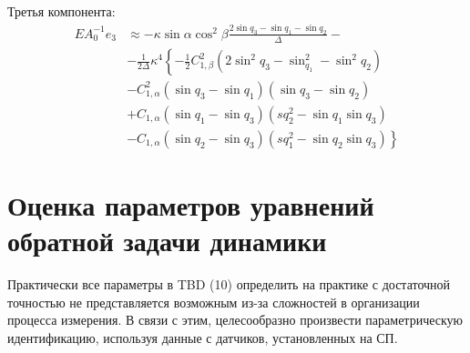 Третья компонента:
\begin{equation}
\begin{aligned}
EA^{-1}_0 e_3 & \approx -\kappa\sin{\alpha}\cos^2{\beta}\frac{2\sin{q_3} - \sin{q_1} - \sin{q_2}}{\Delta} - \\
& -\frac{1}{2\Delta}\kappa^4 \left\lbrace -\frac{1}{2}C^2_{1,\beta}\left(2\sin^2{q_3} - \sin^2_{q_1} - \sin^2{q_2}\right) \right. \\
& \left. -C^2_{1,\alpha}\left(\sin{q_3} - \sin{q_1}\right)\left(\sin{q_3} - \sin{q_2}\right)\right. \\
& \left. +C_{1,\alpha}\left(\sin{q_1} - \sin{q_3}\right)\left(sq^2_2 - \sin{q_1}\sin{q_3}\right)\right. \\
& \left. -C_{1,\alpha}\left(\sin{q_2} - \sin{q_3}\right)\left(sq^2_1 - \sin{q_2}\sin{q_3}\right)\right\rbrace
\end{aligned}
\end{equation}


\section{Оценка параметров уравнений обратной задачи динамики}
Практически все параметры в TBD (10) определить на практике с достаточной точностью не представляется возможным из-за сложностей в организации процесса измерения. В связи с этим, целесообразно произвести параметрическую идентификацию, используя данные с датчиков, установленных на СП.

